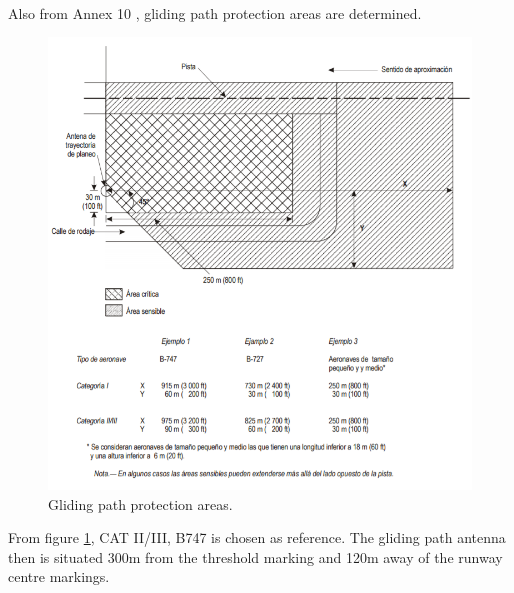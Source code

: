 	\paragraph{} Also from Annex 10 \cite{Telecomunicaciones}, gliding path protection areas are determined.
	\begin{figure}[H]
		\centering
		\includegraphics[clip, trim=0cm 0cm 0cm 0cm, width=\textwidth]{./images/servidumbres/gliding}
		\caption{Gliding path protection areas.}
		\label{gliding}
	\end{figure}

	From figure \ref{gliding}, CAT II/III, B747 is chosen as reference. The gliding path antenna then is situated 300m from the threshold marking and 120m away of the runway centre markings. 
		 